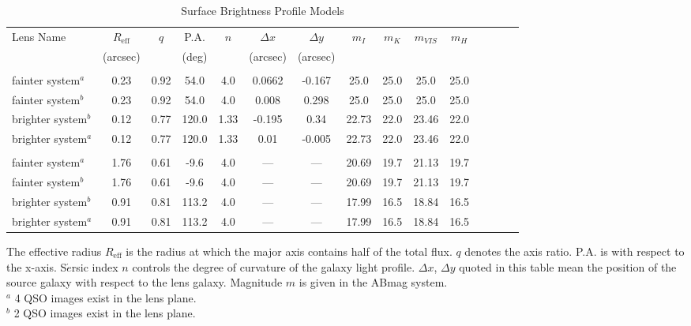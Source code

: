 \documentclass[a4paper,11pt]{article}
\begin{document}
\begin{table}\footnotesize
\begin{center}
\caption{Surface Brightness Profile Models}
\begin{tabular}{lcccccccccccccc|}
\hline \hline
 Lens Name & $R_\textrm{eff}$ & $q$ & P.A. & $n$ & $\Delta x$ & $\Delta y$ & $m_{I}$ & $m_{K}$ & $m_{VIS}$ & $m_{H}$ \\
& (arcsec) & & (deg) & & (arcsec) & (arcsec) & & & & \\
\hline\noalign{\smallskip}
\multicolumn{11}{c}{Parameters for the Source}
\tabularnewline \hline \noalign{\smallskip}
fainter system$^a$  & 0.23 & 0.92 & 54.0 & 4.0 & 0.0662 & -0.167 & 25.0 & 25.0 & 25.0 &25.0 \\
fainter system$^b$ & 0.23 & 0.92 & 54.0 & 4.0 & 0.008 & 0.298 & 25.0 & 25.0 & 25.0 & 25.0 \\
brighter system$^b$ & 0.12 & 0.77 & 120.0 & 1.33 & -0.195 &  0.34 & 22.73 & 22.0 & 23.46 & 22.0 \\
brighter system$^a$ & 0.12 & 0.77 & 120.0 & 1.33 & 0.01 & -0.005 & 22.73 & 22.0 & 23.46 & 22.0 \\

\hline\noalign{\smallskip}
\multicolumn{11}{c}{Parameters for the lens}
\tabularnewline \hline \noalign{\smallskip}
fainter system$^a$ & 1.76 & 0.61 & -9.6 & 4.0 & --- & --- & 20.69 & 19.7 & 21.13 & 19.7 \\
fainter system$^b$ & 1.76 & 0.61 & -9.6 & 4.0 & --- & --- & 20.69 & 19.7 & 21.13 & 19.7 \\
brighter system$^b$ & 0.91 & 0.81 & 113.2 & 4.0 & --- & --- & 17.99 & 16.5 & 18.84 & 16.5 \\
brighter system$^a$ & 0.91 & 0.81 & 113.2 & 4.0 & --- & --- & 17.99 & 16.5 & 18.84 & 16.5 \\
\hline
\hline
\end{tabular}
\begin{tablenotes}
\item 
The effective radius $R_\textrm{eff}$ is the radius at which the major axis contains half of the total flux. $q$ denotes the axis ratio. P.A. is with respect to the x-axis. S$\acute{e}$rsic index $n$ controls the degree of curvature of the galaxy light profile. $\Delta x$, $\Delta y$ quoted in this table mean the position of the source galaxy with respect to the lens galaxy. Magnitude $m$ is given in the ABmag system. \\
$^a$ 4 QSO images exist in the lens plane. \\
$^b$ 2 QSO images exist in the lens plane. \\
\end{tablenotes}
\label{tab:SBProfile}
\end{center}
\end{table}
\end{document}
